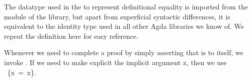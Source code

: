 The datatype used in the \ualib to represent definitional equality is imported from the  module of the \typetopology library, but apart from superficial syntactic differences, it is equivalent to the identity type used in all other Agda libraries we know of.  We repeat the definition here for easy reference.
\ccpad
\begin{code}%
\>[1]\AgdaSpace{}%
\AgdaSpace{}%
\AgdaSymbol{\{}\AgdaSymbol{\}}\AgdaSpace{}%
\AgdaSymbol{\{}\AgdaSpace{}%
\AgdaSymbol{:}\AgdaSpace{}%
\AgdaSpace{}%
\AgdaSpace{}%
\AgdaSymbol{\}}\AgdaSpace{}%
\AgdaSymbol{:}\AgdaSpace{}%
\AgdaSpace{}%
\AgdaSpace{}%
\AgdaSpace{}%
\AgdaSpace{}%
\AgdaSpace{}%
\AgdaSpace{}%
\AgdaSpace{}%
\AgdaSpace{}%
\AgdaSymbol{:}\AgdaSpace{}%
\AgdaSymbol{\{}\AgdaSpace{}%
\AgdaSymbol{:}\AgdaSpace{}%
\AgdaSymbol{\}}\AgdaSpace{}%
\AgdaSpace{}%
\AgdaSpace{}%
\AgdaSpace{}%
\<%
\end{code}
\ccpad
Whenever we need to complete a proof by simply asserting that  is  to itself, we invoke . If we need to make explicit the implicit argument \ab x, then we use ~\{\ab x~=~\ab x\}.

